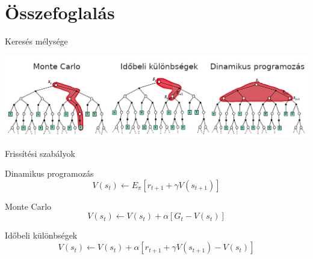 \documentclass[english, aspectratio=169]{beamer}
\makeatletter
\let\origtableofcontents=\tableofcontents
\def\tableofcontents{\@ifnextchar[{\origtableofcontents}{\gobbletableofcontents}}
\def\gobbletableofcontents#1{\origtableofcontents}
\makeatother
\begin{document}
\section{Összefoglalás}

\begin{frame}
\tableofcontents[currentsection]
\end{frame}

\begin{frame}{Keresés mélysége}
\begin{center}
\includegraphics[width=14cm, keepaspectratio]{images/mc_td_11.png}
\end{center}
\end{frame}

\begin{frame}{Frissítési szabályok}
\begin{block}{Dinamikus programozás}
\[
V(s_t) \leftarrow E_\pi \left[ r_{t+1} + \gamma V(s_{t+1}) \right]
\]
\end{block}
\vspace{0.5cm}
\begin{block}{Monte Carlo}
\[
V(s_t) \leftarrow V(s_t) + \alpha \left[ G_t - V(s_t) \right]
\]
\end{block}
\vspace{0.5cm}
\begin{block}{Időbeli különbségek}
\[
V(s_t) \leftarrow V(s_t) + \alpha \left[ r_{t+1} + \gamma V(s_{t+1}) - V(s_t) \right]
\]
\end{block}
\end{frame}
\end{document}

